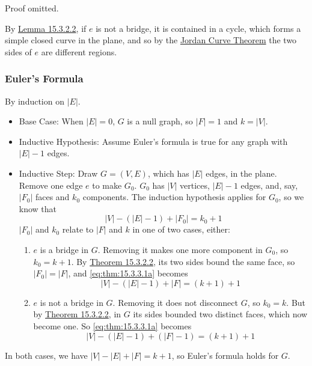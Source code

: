 {Proof omitted.}

{By \hyperref[lem:15.3.2.2]{Lemma 15.3.2.2}, if \(e\) is not a bridge, it is contained in a cycle, which forms a simple closed curve in the plane, and so by the \hyperref[thm:15.3.2.1]{Jordan Curve Theorem} the two sides of \(e\) are different regions.}

\newpage\subsubsection{Euler's Formula}

{By induction on \(|E|\).
\begin{itemize}
    \item Base Case: When \(|E| = 0\), \(G\) is a null graph, so \(|F| = 1\) and \(k = |V|\).
    \item Inductive Hypothesis: Assume Euler's formula is true for any graph with \(|E| - 1\) edges. 
    \item Inductive Step: Draw \(G=(V,E)\), which has \(|E|\) edges, in the plane. Remove one edge \(e\) to make \(G_0\). \(G_0\) has \(|V|\) vertices, \(|E| - 1\) edges, and, say, \(|F_0|\) faces and \(k_0\) components. The induction hypothesis applies for \(G_0\), so we know that
    \begin{equation}\label{eq:thm:15.3.3.1a}
        |V| - (|E| - 1) + |F_0| = k_0 + 1
    \end{equation}
    \(|F_0|\) and \(k_0\) relate to \(|F|\) and \(k\) in one of two cases, either:
    \begin{enumerate}
        \item \(e\) is a bridge in \(G\). Removing it makes one more component in \(G_0\), so \(k_0 = k+1\). By \hyperref[thm:15.3.2.2]{Theorem 15.3.2.2}, its two sides bound the same face, so \(|F_0| = |F|\), and \eqref{eq:thm:15.3.3.1a} becomes
        \begin{equation}
            |V| - (|E| - 1) + |F| = (k+1) + 1
        \end{equation}
        \item \(e\) is not a bridge in \(G\). Removing it does not disconnect \(G\), so \(k_0 = k\). But by \hyperref[thm:15.3.2.2]{Theorem 15.3.2.2}, in \(G\) its sides bounded two distinct faces, which now become one. So \eqref{eq:thm:15.3.3.1a} becomes
        \begin{equation}
            |V| - (|E| - 1) + (|F|-1) = (k+1) + 1
        \end{equation}
    \end{enumerate}
\end{itemize}
In both cases, we have \(|V| - |E| + |F| = k+1\), so Euler's formula holds for \(G\).}

